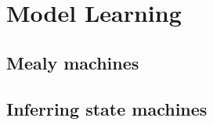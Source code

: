 \section{Model Learning}\label{modellearning}

\subsection{Mealy machines}



\subsection{Inferring state machines}

